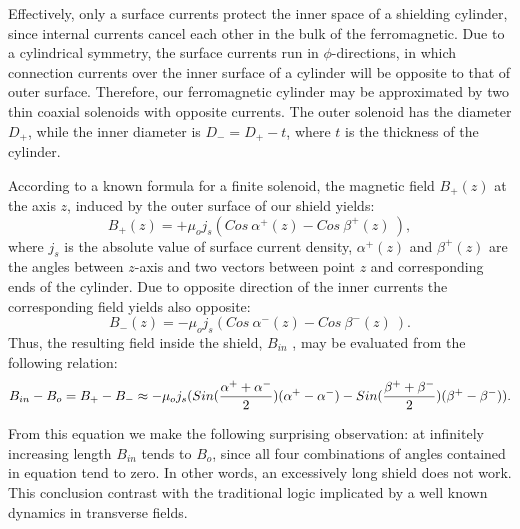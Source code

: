 \documentclass[12pt]{article}
\begin{document}
Effectively, only a  surface currents protect the inner space of a shielding cylinder, since 
internal  currents cancel each other in the bulk of the ferromagnetic.
Due to a cylindrical symmetry, the surface  currents  run in $\phi$-directions,
in which connection  currents over the inner surface of a cylinder
will be opposite to that of  outer surface. Therefore, our ferromagnetic cylinder  
may be approximated by two  thin coaxial solenoids with opposite currents.
The outer solenoid has the diameter $D_+$, while the inner diameter is
$D_-=D_+-t$, where $t$ is the thickness of the  cylinder.


According  to a  known formula for  a finite  solenoid, the magnetic field   $B_+(z)$ 
at the axis $z$, induced by the outer surface of our shield  yields:
\begin{equation}
 B_+(z)=+\mu_o j_s(Cos~\alpha^+(z)-Cos~\beta^+(z)~),
\label{eq31}
\end{equation}
where $j_s$ is the absolute value of surface current density, 
$\alpha^{+}(z)$ and $\beta^{+}(z)$ are  the  angles between 
$z$-axis and two  vectors between   point $z$ and corresponding 
ends  of the  cylinder.
Due to  opposite direction of  the inner currents the corresponding field yields  also 
opposite:
\begin{equation}
B_-(z)=-\mu_o j_s(Cos~\alpha^-(z) - Cos~\beta^-(z)~).
\label{eq32}
\end{equation}
Thus, the resulting  field inside the shield, $B_{in}$ , may be evaluated from the following relation:
\begin{equation}
B_{in}-B_o = B_+ - B_-
\approx - \mu_o j_s
\small{(Sin(\frac{\alpha^++\alpha^-}{2})(\alpha^+-\alpha^-)
-Sin(\frac{\beta^++\beta^-}{2})(\beta^+-\beta^-))}.
\label{eq1}
\end{equation}

From this equation we make the following  surprising   observation:
at infinitely increasing length  $B_{in}$ tends to  $B_o$, 
since all four  combinations of  angles contained 
in equation tend to  zero.
In other words, an excessively  long shield  does  not work. 
This conclusion contrast with the traditional logic implicated by a well known 
dynamics  in  transverse fields. 
\end{document}
